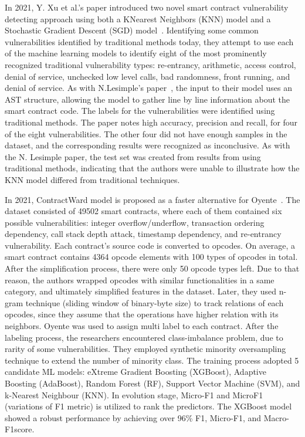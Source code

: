 In 2021, Y. Xu et al.'s paper introduced two novel smart contract vulnerability detecting approach using both a KNearest Neighbors (KNN) model and a Stochastic Gradient Descent (SGD) model~\cite{slither}.
Identifying some common vulnerabilities identified by traditional methods today, they attempt to use each of the machine learning models to identify eight of the most prominently recognized traditional vulnerability types: re-entrancy, arithmetic, access control, denial of service, unchecked low level calls, bad randomness, front running, and denial of service.
As with N.Lesimple's paper~\cite{he2019learning}, the input to their model uses an AST structure, allowing the model to gather line by line information about the smart contract code.
The labels for the vulnerabilities were identified using traditional methods.
The paper notes high accuracy, precision and recall, for four of the eight vulnerabilities.
The other four did not have enough samples in the dataset, and the corresponding results were recognized as inconclusive. As with the N. Lesimple paper, the test set was created from results from using traditional methods, indicating that the authors were unable to illustrate how the KNN model differed from traditional techniques.

In 2021, ContractWard model is proposed as a faster alternative for Oyente~\cite{oyente}.
The dataset consisted of 49502 smart contracts, where each of them contained six possible vulnerabilities: integer overflow/underflow, transaction ordering dependency, call stack depth attack, timestamp dependency, and re-entrancy vulnerability.
Each contract's source code is converted to opcodes.
On average, a smart contract contains 4364 opcode elements with 100 types of opcodes in total.
After the simplification process, there were only 50 opcode types left.
Due to that reason, the authors wrapped opcodes with similar functionalities in a same category, and ultimately simplified features in the dataset.
Later, they used n-gram technique (sliding window of binary-byte size) to track relations of each opcodes, since they assume that the operations have higher relation with its neighbors.
Oyente was used to assign multi label to each contract.
After the labeling process, the researchers encountered class-imbalance problem, due to rarity of some vulnerabilities.
They employed synthetic minority oversampling technique to extend the number of minority class.
The training process adopted 5 candidate ML models: eXtreme Gradient Boosting (XGBoost), Adaptive Boosting (AdaBoost), Random Forest (RF), Support Vector Machine (SVM), and k-Nearest Neighbour (KNN).
In evolution stage, Micro-F1 and MicroF1 (variations of F1 metric) is utilized to rank the predictors.
The XGBoost model showed a robust performance by achieving over 96\% F1, Micro-F1, and Macro-F1score.

